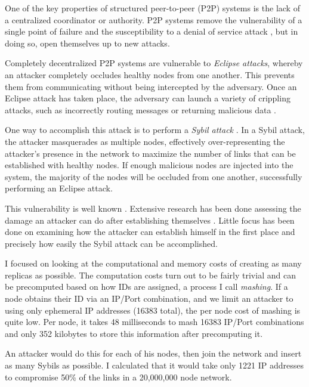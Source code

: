 One of the key properties of structured peer-to-peer (P2P) systems is the lack of a centralized coordinator or authority.
P2P systems remove the vulnerability of a single point of failure and the susceptibility to a denial of service attack \cite{sybil}, but in doing so, open themselves up to new attacks.

Completely decentralized P2P systems are vulnerable to \textit{Eclipse attacks}, whereby an attacker completely occludes healthy nodes from one another.
This prevents them from communicating without being intercepted by the adversary.
Once an Eclipse attack has taken place, the adversary can launch a variety of crippling attacks, such as incorrectly routing messages or returning malicious data \cite{srivatsa2004vulnerabilities}.



One way to accomplish this attack is to perform a \emph{Sybil attack} \cite{sybil}.
In a Sybil attack, the attacker masquerades as multiple nodes, effectively over-representing the attacker's presence in the network to maximize the number of links that can be established with healthy nodes.
If enough malicious nodes are injected into the system, the majority of the nodes will be occluded from one another, successfully performing an Eclipse attack.

This vulnerability is well known \cite{dhtsec}. 
Extensive research has been done assessing the damage an attacker can do after establishing themselves \cite{srivatsa2004vulnerabilities}.
Little focus has been done on examining how the attacker can establish himself in the first place and precisely how easily the Sybil attack can be accomplished.


I focused on looking at the computational and memory costs of creating as many replicas as possible.
The computation costs turn out to be fairly trivial and can be precomputed based on how IDs are assigned, a process I call \textit{mashing}.
If a node obtains their ID via an IP/Port combination, and we limit an attacker to using only ephemeral IP addresses (16383 total), the per node cost of mashing is quite low.
Per node, it takes 48 milliseconds to mash 16383 IP/Port combinations and only 352 kilobytes to store this information after precomputing it.


An attacker would do this for each of his nodes, then join the network and insert as many Sybils as possible.
I calculated that it would take only 1221 IP addresses to compromise 50\% of the links in a 20,000,000 node network.

